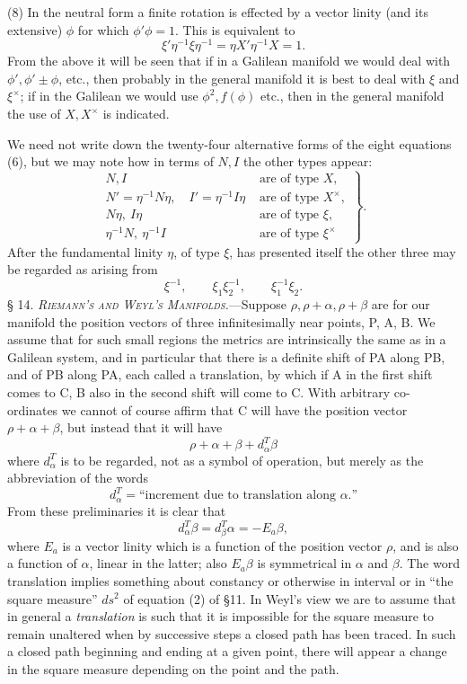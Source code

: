 \documentclass[11pt]{article}
\begin{document}
\indent (8) In the neutral form a finite rotation is effected by a vector linity (and its extensive) $\phi$ for which $\phi'\phi=1$. This is equivalent to
\[
\xi'\eta^{-1}\xi\eta^{-1}=\eta X'\eta^{-1}X=1.
\]
From the above it will be seen that if in a Galilean manifold we would deal with $\phi',\phi'\pm\phi$, etc., then probably in the general manifold it is best to deal with $\xi$ and $\xi^\times$; if in the Galilean we would use $\phi^2,f(\phi)$ etc., then in the general manifold the use of $X,X^\times$ is indicated.

\indent We need not write down the twenty-four alternative forms of the eight equations (6), but we may note how in terms of $N,I$ the other types appear:
\begin{equation}\left.\begin{aligned}
N,I&\text{ are of type }X,\\
N'=\eta^{-1}N\eta,\quad I'=\eta^{-1}I\eta&\text{ are of type }X^\times,\\
N\eta,\ I\eta&\text{ are of type }\xi,\\
\eta^{-1}N,\ \eta^{-1}I&\text{ are of type }\xi^\times
\end{aligned}\right\}.\tag{9}\end{equation}
After the fundamental linity $\eta$, of type $\xi$, has presented itself the other three may be regarded as arising from
\[
\xi^{-1},\qquad\xi_1\xi_2^{-1},\qquad\xi_1^{-1}\xi_2.
\]
\noindent\textsc{§ 14. \emph{Riemann's and Weyl's Manifolds.}}---Suppose $\rho,\rho+\alpha,\rho+\beta$ are for our manifold the position vectors of three infinitesimally near points, P, A, B. We assume that for such small regions the metrics are intrinsically the same as in a Galilean system, and in particular that there is a definite shift of PA along PB, and of PB along PA, each called a translation, by which if A in the first shift comes to C, B also in the second shift will come to C. With arbitrary co-ordinates we cannot of course affirm that C will have the position vector $\rho+\alpha+\beta$, but instead that it will have
\[
\rho+\alpha+\beta+d_\alpha^T\beta
\]
where $d_\alpha^T$ is to be regarded, not as a symbol of operation, but merely as the abbreviation of the words
\begin{equation}d_\alpha^T=\text{``increment due to translation along }\alpha\text{.''}\tag{1}\end{equation}
From these preliminaries it is clear that
\begin{equation}d_\alpha^T\beta=d_\beta^T\alpha=-E_a\beta,\tag{2}\end{equation}
where $E_a$ is a vector linity which is a function of the position vector $\rho$, and is also a function of $\alpha$, linear in the latter; also $E_a\beta$ is symmetrical in $\alpha$ and $\beta$.
The word translation implies something about constancy or otherwise in interval or in ``the square measure'' $ds^2$ of equation (2) of §11. In Weyl's view we are to assume that in general a \emph{translation} is such that it is impossible for the square measure to remain unaltered when by successive steps a closed path has been traced. In such a closed path beginning and ending at a given point, there will appear a change in the square measure depending on the point and the path.
\end{document}
